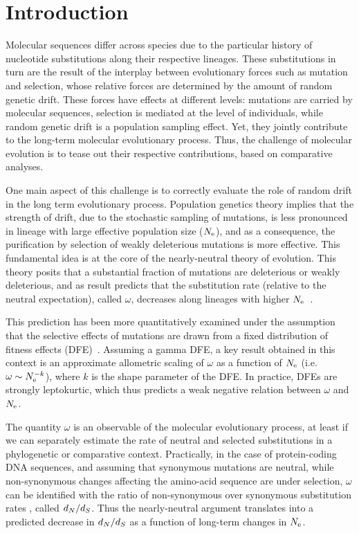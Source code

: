 \section{Introduction}

Molecular sequences differ across species due to the particular history of nucleotide \glspl{substitution} along their respective lineages.
These \glspl{substitution} in turn are the result of the interplay between evolutionary forces such as mutation and selection, whose relative forces are determined by the amount of random \gls{genetic drift}.
These forces have effects at different levels: mutations are carried by molecular sequences, selection is mediated at the level of individuals, while random \gls{genetic drift} is a population sampling effect.
Yet, they jointly contribute to the long-term molecular evolutionary process.
Thus, the challenge of molecular evolution is to tease out their respective contributions, based on comparative analyses.

One main aspect of this challenge is to correctly evaluate the role of random drift in the long term evolutionary process.
Population genetics theory implies that the strength of drift, due to the stochastic sampling of mutations, is less pronounced in lineage with large \gls{effective population size} ($N_{\text{e}}$), and as a consequence, the purification by selection of weakly deleterious mutations is more effective.
This fundamental idea is at the core of the \gls{nearly-neutral} theory of evolution.
This theory posits that a substantial fraction of mutations are deleterious or weakly deleterious, and as result predicts that the \gls{substitution} rate (relative to the \gls{neutral} expectation), called $\omega$, decreases along lineages with higher $N_{\text{e}}$~\citep{Ohta1972, Ohta1992}.

This prediction has been more quantitatively examined under the assumption that the selective effects of mutations are drawn from a fixed distribution of fitness effects (\acrshort{DFE})~\citep{Kimura1979, Welch2008}.
Assuming a gamma \acrshort{DFE}, a key result obtained in this context is an approximate allometric scaling of $\omega$ as a function of $N_{\text{e}}$ (i.e.~$\omega \sim N_{\text{e}}^{-k}$), where $k$ is the shape parameter of the \acrshort{DFE}.
In practice, DFEs are strongly leptokurtic, which thus predicts a weak negative relation between $\omega$ and $N_{\text{e}}$.

The quantity $\omega$ is an observable of the molecular evolutionary process, at least if we can separately estimate the rate of \gls{neutral} and selected \glspl{substitution} in a phylogenetic or comparative context.
Practically, in the case of protein-coding \acrshort{DNA} sequences, and assuming that \gls{synonymous} mutations are \gls{neutral}, while \gls{non-synonymous} changes affecting the amino-acid sequence are under selection, $\omega$ can be identified with the ratio of \gls{non-synonymous} over \gls{synonymous} \gls{substitution} rates , called $d_N / d_S$.
Thus the \gls{nearly-neutral} argument translates into a predicted decrease in $d_N / d_S$ as a function of long-term changes in $N_{\text{e}}$.

